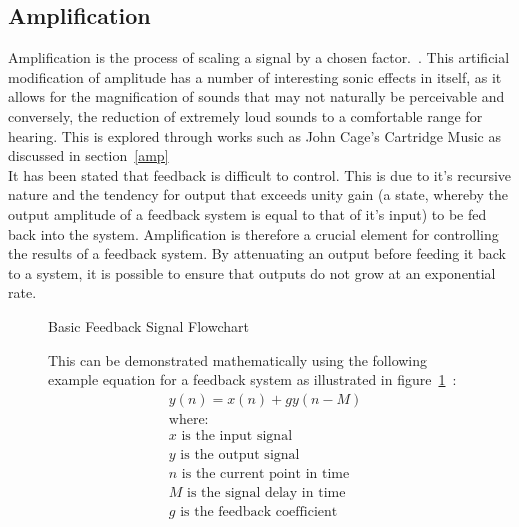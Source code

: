 \documentclass[titlepage]{scrartcl}
\begin{document}
    \subsection{Amplification}
    Amplification is the process of scaling a signal by a chosen factor.~\parencite[p.3-4]{kadis2012sosr}. 
    This artificial modification of amplitude has a number of interesting sonic
    effects in itself, as it allows for the magnification of sounds that may not
    naturally be perceivable and conversely, the reduction of extremely loud
    sounds to a comfortable range for hearing. This is explored through
    works such as John Cage's Cartridge Music as discussed in
    section~\ref{amp}\\

    It has been stated that feedback is difficult to control. This is due to
    it's recursive nature and the tendency for output that exceeds unity gain
    (a state, whereby the output amplitude of a feedback system is equal to
    that of it's input) to be fed back into the system.  Amplification is
    therefore a crucial element for controlling the results of a feedback
    system. By attenuating an output before feeding it back to a system, it is
    possible to ensure that outputs do not grow at an exponential
    rate.~\parencite[p.71-72]{zolzer2011dafx}
    \begin{figure}[H]
        \caption[Caption for LOF]{Basic Feedback Signal Flowchart\protect\footnotemark}
        \label{feed_flowchart}
    \end{figure}


    \begin{figure}[H]
    This can be demonstrated mathematically using the following example equation
    for a feedback system as illustrated in figure~\ref{feed_flowchart}~\parencite[p.70-72]{zolzer2011dafx}:
        \begin{align*}
            & y(n) = x(n) + gy(n-M)\\
            & \text{where:}\\
            & x\text{ is the input signal}\\
            & y\text{ is the output signal}\\
            & n\text{ is the current point in time}\\
            & M\text{ is the signal delay in time}\\
            & g\text{ is the feedback coefficient}\\
        \end{align*}
    \end{figure}
\end{document}
